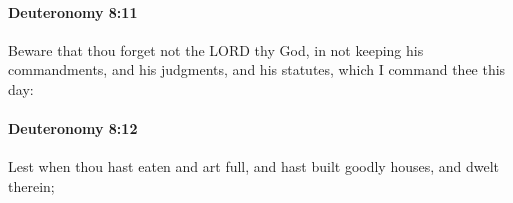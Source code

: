 		\paragraph{Deuteronomy 8:11} %
			\label{DEUTERONOMY-8-11}

			Beware that thou forget not the LORD thy God, in not keeping his commandments, and his judgments, and his statutes, which I command thee this day:


		\paragraph{Deuteronomy 8:12} %
			\label{DEUTERONOMY-8-12}

			Lest when thou hast eaten and art full, and hast built goodly houses, and dwelt therein;



